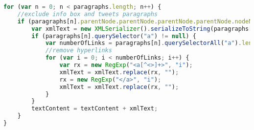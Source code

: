 \begin{lstlisting}[language= Javascript,caption=Vermeidung von Infoboxen \, Twitternachrichten und Hyperlinks in den Artikeln., label={lst:artikelabsätze}]
for (var n = 0; n < paragraphs.length; n++) {
    //exclude info box and tweets paragraphs
    if (paragraphs[n].parentNode.parentNode.parentNode.parentNode.nodeName != "infobox" && paragraphs[n].parentNode.getAttribute("class") != "twitter-tweet"){
        var xmlText = new XMLSerializer().serializeToString(paragraphs[n]);
        if (paragraphs[n].querySelector("a") != null) {
            var numberOfLinks = paragraphs[n].querySelectorAll("a").length;
            //remove hyperlinks
            for (var i = 0; i < numberOfLinks; i++) {
                var rx = new RegExp("<a[^<>]+>", "i");
                xmlText = xmlText.replace(rx, "");
                rx = new RegExp("</a>", "i");
                xmlText = xmlText.replace(rx, "");
            }
        }
        textContent = textContent + xmlText;
    }
}
\end{lstlisting} 